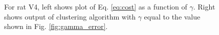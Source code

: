 \documentclass[superscriptaddress, twocolumn, prl]{revtex4}
\begin{document}
\begin{figure}
\centering
{}
\caption{For rat V4, left shows plot of Eq. \ref{eq:cost} as a function of $\gamma$. Right shows output of clustering algorithm with $\gamma$ equal to the value shown in Fig. \ref{fig:gamma_error}.}
\end{figure}
\end{document}
